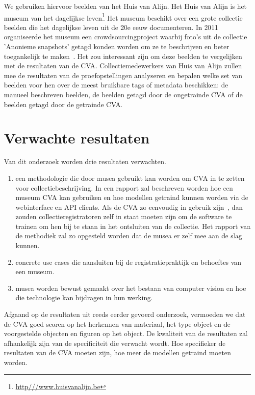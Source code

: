 We gebruiken hiervoor beelden van het Huis van Alijn. Het Huis van Alijn is het museum van het dagelijkse leven\footnote{\url{http///www.huisvanalijn.be}} Het museum beschikt over een grote collectie beelden die het dagelijkse leven uit de 20e eeuw documenteren. In 2011 organiseerde het museum een crowdsourcingproject waarbij foto's uit de collectie 'Anonieme snapshots' getagd konden worden om ze te beschrijven en beter toegankelijk te maken~\autocite{Wiericx2011}. Het zou interessant zijn om deze beelden te vergelijken met de resultaten van de CVA. Collectiemedewerkers van Huis van Alijn zullen mee de resultaten van de proefopstellingen analyseren en bepalen welke set van beelden voor hen over de meest bruikbare tags of metadata beschikken: de manueel beschreven beelden, de beelden getagd door de ongetrainde CVA of de beelden getagd door de getrainde CVA.

\section{Verwachte resultaten}

Van dit onderzoek worden drie resultaten verwachten.

\begin{enumerate}
\item een methodologie die door musea gebruikt kan worden om CVA in te zetten voor collectiebeschrijving. In een rapport zal beschreven worden hoe een museum CVA kan gebruiken en hoe modellen getraind kunnen worden via de webinterface en API clients. Als de CVA zo eenvoudig in gebruik zijn~\autocite{Lardinois2018}, dan zouden collectieregistratoren zelf in staat moeten zijn om de software te trainen om hen bij te staan in het ontsluiten van de collectie. Het rapport van de methodiek zal zo opgesteld worden dat de musea er zelf mee aan de slag kunnen.
\item concrete use cases die aansluiten bij de registratiepraktijk en behoeftes van een museum.
\item musea worden bewust gemaakt over het bestaan van computer vision en hoe die technologie kan bijdragen in hun werking.
\end{enumerate}

Afgaand op de resultaten uit reeds eerder gevoerd onderzoek, vermoeden we dat de CVA goed scoren op het herkennen van materiaal, het type object en de voorgestelde objecten en figuren op het object. De kwaliteit van de resultaten zal afhankelijk zijn van de specificiteit die verwacht wordt. Hoe specifieker de resultaten van de CVA moeten zijn, hoe meer de modellen getraind moeten worden.
